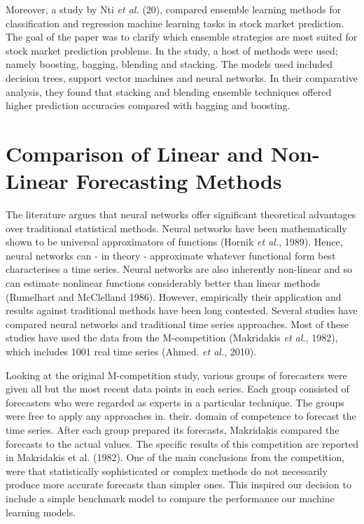 Moreover, a study by Nti \textit{et al.} (20), compared ensemble learning methods for classification and regression machine learning tasks in stock market prediction. The goal of the paper was to clarify which ensemble strategies are most suited for stock market prediction problems. In the study, a host of methods were used; namely boosting, bagging, blending and stacking. The models used included decision trees, support vector machines and neural networks. In their comparative analysis, they found that stacking and blending ensemble techniques offered higher prediction accuracies compared with bagging and boosting. 


\section{Comparison of Linear and Non-Linear Forecasting Methods}

The literature argues that neural networks offer significant theoretical advantages over traditional statistical methods. Neural networks have been mathematically shown to be universal approximators of functions (Hornik \textit{et al.}, 1989). Hence, neural networks can - in theory - approximate whatever functional form best characterises a time series. Neural networks are also inherently non-linear and so can estimate nonlinear functions considerably better than linear methods (Rumelhart and McClelland 1986). However, empirically their application and results against traditional methods have been long contested. Several studies have compared neural networks and traditional time series approaches. Most of these studies have used the data from the M-competition (Makridakis \textit{et al.}, 1982), which includes 1001 real time series (Ahmed. \textit{et al.}, 2010). 

Looking at the original M-competition study, various groups of forecasters were given all but the most recent data points in each series. Each group consisted of forecasters who were regarded as experts in a particular technique. The groups were free to apply any approaches in. their. domain of competence to forecast the time series. After each group prepared its forecasts, Makridakis compared the forecasts to the actual values. The specific results of this competition are reported in Makridakis et al. (1982). One of the main conclusions from the competition, were that statistically sophisticated or complex methods do not necessarily produce more accurate forecasts than simpler ones. This inspired our decision to include a simple benchmark model to compare the performance our machine learning models. 

